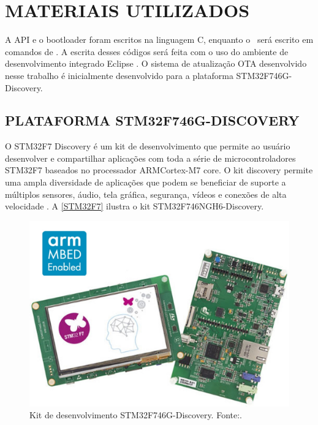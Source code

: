 \section{MATERIAIS UTILIZADOS}

A API e o bootloader foram escritos na linguagem C, enquanto o \linker\ será escrito em comandos de \linker. A escrita desses códigos será feita com o uso do ambiente de desenvolvimento integrado Eclipse \cite{Eclipse}. O sistema de atualização OTA desenvolvido nesse trabalho é inicialmente desenvolvido para a plataforma STM32F746G-Discovery.

\subsection{PLATAFORMA STM32F746G-DISCOVERY}

O STM32F7 Discovery é um kit de desenvolvimento que permite ao usuário desenvolver e compartilhar aplicações com toda a série de microcontroladores STM32F7 baseados no processador ARM\textregistered  Cortex\textregistered-M7 core.
O kit discovery permite uma ampla diversidade de aplicações que podem se beneficiar de suporte a múltiplos sensores, áudio, tela gráfica, segurança, vídeos e conexões de alta velocidade \cite{STM32F7}.
A \autoref{STM32F7} ilustra o kit STM32F746NGH6-Discovery.

\begin{figure}[H]
    \scriptsize
     \centering
     \includegraphics[scale=0.4]{dados/figuras/STM32F7.jpg}
     \caption{Kit de desenvolvimento STM32F746G-Discovery. \newline Fonte:\cite{STM32F7}.}
     \label{STM32F7}
\end{figure}

